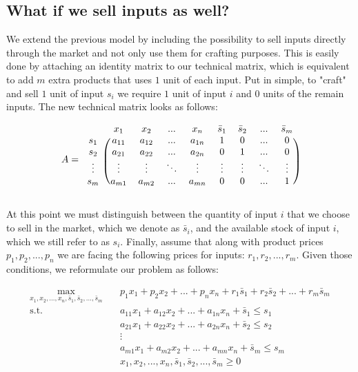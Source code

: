 \documentclass[12pt]{article}         %
\begin{document}
\subsection{What if we sell inputs as well?}
We extend the previous model by including the possibility to sell inputs directly through the market and not only use them for crafting purposes. This is easily done by attaching an identity matrix to our technical matrix, which is equivalent to add $m$ extra products that uses $1$ unit of each input. Put in simple, to "craft" and sell $1$ unit of input $s_i$ we require $1$ unit of input $i$ and $0$ units of the remain inputs. The new technical matrix looks as follows:

\[
A = 
\begin{blockarray}{ccccccccc}
& x_1 & x_2 & ... & x_n & \bar{s}_1 & \bar{s}_2 & ... & \bar{s}_m \\
\begin{block}{c(cccccccc)}
  s_1 & a_{11} & a_{12} & ...    & a_{1n} & 1 & 0 & ... & 0 \\
  s_2 & a_{21} & a_{22} & ...    & a_{2n} & 0 & 1 & ... & 0 \\
  \vdots & \vdots & \vdots & \ddots & \vdots & \vdots & \vdots & \ddots & \vdots \\
  s_m & a_{m1} & a_{m2} & ...    & a_{mn} & 0 & 0 & ... & 1 \\
\end{block}
\end{blockarray}
 \]
 
At this point we must distinguish between the quantity of input $i$ that we choose to sell in the market, which we denote as $\bar{s}_i$, and the available stock of input $i$, which we still refer to as $s_i$. Finally, assume that along with product prices $p_1, p_2, ..., p_n$ we are facing the following prices for inputs: $r_1, r_2, ..., r_m$. Given those conditions, we reformulate our problem as follows:

\begin{equation}
\begin{aligned}
\max_{x_1,x_2,...,x_n,\bar{s}_1,\bar{s}_2,...,\bar{s}_m} \quad & p_1x_1 + p_2x_2 + ... + p_nx_n + r_1\bar{s}_1 + r_2\bar{s}_2 + ... + r_m\bar{s}_m \\
\textrm{s.t.} \quad & a_{11}x_1 + a_{12}x_2 + ... + a_{1n}x_n + \bar{s}_1 \leq s_1\\
  &a_{21}x_1 + a_{22}x_2 + ... + a_{2n}x_n + \bar{s}_2 \leq s_2\\
  &\vdots \\
  &a_{m1}x_1 + a_{m2}x_2 + ... + a_{mn}x_n + \bar{s}_m \leq s_m\\
  &x_1,x_2,...,x_n,\bar{s}_1,\bar{s}_2,...,\bar{s}_m\geq0    \\
\end{aligned}
\end{equation}
\end{document}
